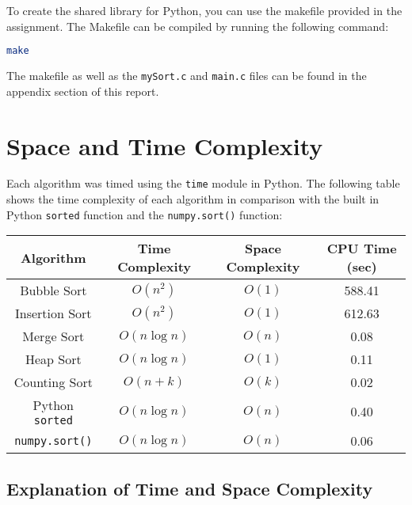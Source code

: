 \documentclass[12pt]{article}
\begin{document}
To create the shared library for Python, you can use the makefile provided in the assignment.
The Makefile can be compiled by running the following command:

\begin{lstlisting}[language=bash]
make
\end{lstlisting}

The makefile as well as the \texttt{mySort.c} and \texttt{main.c} files can be found in the appendix section of this report.

\section{Space and Time Complexity}

Each algorithm was timed using the \texttt{time} module in Python.
The following table shows the time complexity of each algorithm in comparison with the built in Python \texttt{sorted} function and the \texttt{numpy.sort()} function:

\begin{center}
	\begin{tabular}{|c|c|c|c|}
	\hline
	\textbf{Algorithm} & \textbf{Time Complexity} & \textbf{Space Complexity} & \textbf{CPU Time (sec)}\\
	\hline
	Bubble Sort & $O(n^2)$ & $O(1)$ & 588.41 \\
	Insertion Sort & $O(n^2)$ & $O(1)$ & 612.63 \\
	Merge Sort & $O(n\log n)$ & $O(n)$ & 0.08 \\
	Heap Sort & $O(n\log n)$ & $O(1)$ & 0.11 \\
	Counting Sort & $O(n + k)$ & $O(k)$ & 0.02 \\
	Python \texttt{sorted} & $O(n\log n)$ & $O(n)$ & 0.40 \\
	\texttt{numpy.sort()} & $O(n\log n)$ & $O(n)$ & 0.06 \\
	\hline
	\end{tabular}
\end{center}

\subsection{Explanation of Time and Space Complexity}
\end{document}
